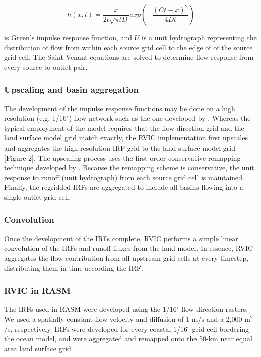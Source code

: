 \documentclass[ms, draft]{agutex}
\begin{document}
\begin{article}
 \begin{equation}
	h(x, t) = \frac{x}{2t\sqrt{\pi tD}}exp\left(-\frac{(Ct-x)^2}{4Dt}\right)
 \end{equation}

is Green’s impulse response function, and $U$ is a unit hydrograph representing the distribution of flow from within each source grid cell to the edge of of the source grid cell.
The Saint-Venant equations are solved to determine flow response from every source to outlet pair.

\subsubsection{Upscaling and basin aggregation}

The development of the impulse response functions may be done on a high resolution (e.g. 1/16$^{\circ}$) flow network such as the one developed by \citet{Wu_2011}.
Whereas the typical employment of the \citet{Lohmann_1996} model requires that the flow direction grid and the land surface model grid match exactly, the RVIC implementation first upscales and aggregates the high resolution IRF grid to the land surface model grid [Figure 2].
The upscaling process uses the first-order conservative remapping technique developed by \citep{Jones_1999}.
Because the remapping scheme is conservative, the unit response to runoff (unit hydrograph) from each source grid cell is maintained.
Finally, the regridded IRFs are aggregated to include all basins flowing into a single outlet grid cell.

\subsubsection{Convolution}

Once the development of the IRFs complete, RVIC performs a simple linear convolution of the IRFs and runoff fluxes from the land model.
In essence, RVIC aggregates the flow contribution from all upstream grid cells at every timestep, distributing them in time according the IRF.

\subsubsection{RVIC in RASM}

The IRFs used in RASM were developed using the \citet{Wu_2011} 1/16$^{\circ}$ flow direction rasters.
We used a spatially constant flow velocity and diffusion of 1 m/s and a 2,000 m$^2$/s, respectively.
IRFs were developed for every coastal 1/16$^{\circ}$ grid cell bordering the ocean model, and were aggregated and remapped onto the 50-km near equal area land surface grid.


\end{article}
\end{document}
